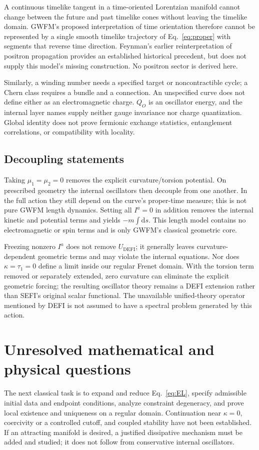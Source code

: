 \documentclass[aip,jmp,reprint,onecolumn,amsmath,amssymb]{revtex4-2}
\newcommand{\dd}{\mathrm{d}}
\newcommand{\U}{U_{\mathrm{DEFI}}}
\begin{document}
A continuous timelike tangent in a time-oriented Lorentzian manifold cannot change between the future and past timelike cones without leaving the timelike domain. GWFM's proposed interpretation of time orientation therefore cannot be represented by a single smooth timelike trajectory of Eq.~\eqref{eq:proper} with segments that reverse time direction. Feynman's earlier reinterpretation of positron propagation provides an established historical precedent,\cite{feynman} but does not supply this model's missing construction. No positron sector is derived here.

Similarly, a winding number needs a specified target or noncontractible cycle; a Chern class requires a bundle and a connection. An unspecified curve does not define either as an electromagnetic charge. $Q_O$ is an oscillator energy, and the internal layer names supply neither gauge invariance nor charge quantization. Global identity does not prove fermionic exchange statistics, entanglement correlations, or compatibility with locality.

\subsection{Decoupling statements}
Taking $\mu_1=\mu_2=0$ removes the explicit curvature/torsion potential. On prescribed geometry the internal oscillators then decouple from one another. In the full action they still depend on the curve's proper-time measure; this is not pure GWFM length dynamics. Setting all $I^a=0$ in addition removes the internal kinetic and potential terms and yields $-m\int\dd s$. This length model contains no electromagnetic or spin terms and is only GWFM's classical geometric core.

Freezing nonzero $I^a$ does not remove $\U$; it generally leaves curvature-dependent geometric terms and may violate the internal equations. Nor does $\kappa=\tau_1=0$ define a limit inside our regular Frenet domain. With the torsion term removed or separately extended, zero curvature can eliminate the explicit geometric forcing; the resulting oscillator theory remains a DEFI extension rather than SEFI's original scalar functional. The unavailable unified-theory operator mentioned by DEFI is not assumed to have a spectral problem generated by this action.

\section{Unresolved mathematical and physical questions}
The next classical task is to expand and reduce Eq.~\eqref{eq:EL}, specify admissible initial data and endpoint conditions, analyze constraint degeneracy, and prove local existence and uniqueness on a regular domain. Continuation near $\kappa=0$, coercivity or a controlled cutoff, and coupled stability have not been established. If an attracting manifold is desired, a justified dissipative mechanism must be added and studied; it does not follow from conservative internal oscillators.
\end{document}
